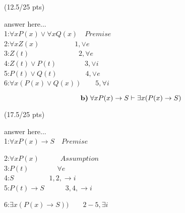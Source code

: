 \documentclass[a4paper,12pt]{article}
\begin{document}
\hfill \small{(12.5/25 pts)}\\
\newpage
\begin{tcolorbox}
answer here...\\

1:$\forall x P(x)\lor \forall x Q(x) \quad Premise$\\
2:$\forall x Z(x) \quad\quad\quad\quad\quad 1,\lor e$\\
3:$Z(t) \quad\quad\quad\quad\quad\quad\quad 2,\forall e$\\
4:$Z(t)\lor P(t) \quad\quad\quad\quad 3,\lor i$\\
5:$P(t)\lor Q(t) \quad\quad\quad\quad 4,\lor e$\\
6:$\forall x(P(x)\lor Q(x)) \quad\quad 5,\forall i$\\
\vspace{1cm} %
\end{tcolorbox}

\begin{equation*}
    \textbf{b)} \; \forall x P(x) \rightarrow S \vdash \exists x (P(x)\rightarrow S)\\
\end{equation*}

\hfill \small{(17.5/25 pts)}\\
\begin{tcolorbox}
answer here...\\
1:$\forall x P(x)\rightarrow S \quad Premise$\\
\begin{tcolorbox}
2:$\forall x P(x) \quad\quad\quad Assumption$\\
3:$P(t)\quad\quad\quad\quad \forall e$\\
4:$S \quad\quad\quad\quad\quad 1,2,\rightarrow i$\\
5:$P(t)\rightarrow S \quad\quad\quad 3,4,\rightarrow i$\\
\end{tcolorbox}
6:$\exists x(P(x)\rightarrow S)) \quad\quad 2-5,\exists i$\\
\vspace{1cm} %
\end{tcolorbox}
\end{document}
